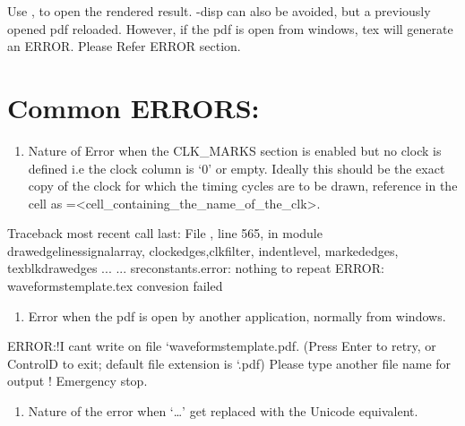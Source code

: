 \documentclass[letterpaper,10pt,english]{sphinxmanual}
\begin{document}
Use , to open the rendered result. -disp can also be avoided, but a
previously opened pdf reloaded. However, if the pdf is open from windows,
tex will generate an ERROR. Please Refer ERROR section.


\section{Common ERRORS:}
\label{\detokenize{intro:common-errors}}\begin{enumerate}
\item {} 
Nature of Error when the CLK\_MARKS section is enabled but no clock is defined
i.e the clock column is ‘0’ or empty. Ideally this should be the exact copy
of the clock for which the timing cycles are to be drawn, reference in the
cell as =\textless{}cell\_containing\_the\_name\_of\_the\_clk\textgreater{}.

\end{enumerate}

%
\begin{sphinxVerbatim}[commandchars=\\\{\}]
Traceback most recent call last:
  File , line 565, in \PYGZlt{}module\PYGZgt{}
      draw\PYGZus{}edge\PYGZus{}linessignal\PYGZus{}array, clock\PYGZus{}edges,clk\PYGZus{}filter, indent\PYGZus{}level, marked\PYGZus{}edges, tex\PYGZus{}blk\PYGZus{}drawedges
  ...
  ...
sre\PYGZus{}constants.error: nothing to repeat
ERROR: waveforms\PYGZus{}template.tex convesion failed
\end{sphinxVerbatim}
\begin{enumerate}
\item {} 
Error when the pdf is open by another application, normally from windows.

\end{enumerate}

%
\begin{sphinxVerbatim}[commandchars=\\\{\}]
ERROR:!I can\PYGZsq{}t write on file {}`waveforms\PYGZus{}template.pdf\PYGZsq{}.
       (Press Enter to retry, or Control\PYGZhy{}D to exit; default file extension is {}`.pdf\PYGZsq{})
       Please type another file name for output
       ! Emergency stop.
\end{sphinxVerbatim}
\begin{enumerate}
\item {} 
Nature of the error when ‘…’ get replaced with the Unicode equivalent.

\end{enumerate}
\end{document}
